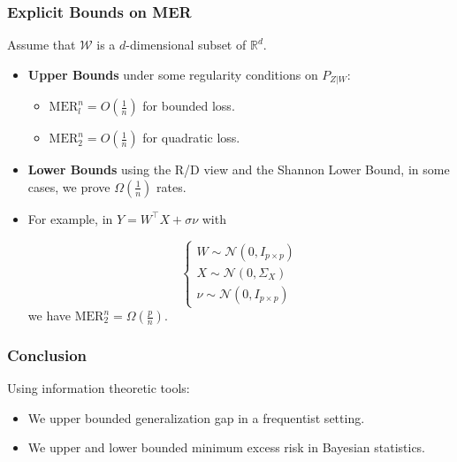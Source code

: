 \documentclass[usenames,dvipsnames, 10pt]{beamer}
\newcommand{\R}{\mathbb{R}}
\begin{document}
\begin{frame}
	\frametitle{Explicit Bounds on MER}
	Assume that $\mathcal{W}$ is a $d$-dimensional subset of $\R^d$.
	
	\vspace{0.5cm}
	
	\begin{itemize}
		\item \textbf{Upper Bounds} under some regularity conditions on $P_{Z|W}$:
		\begin{itemize}
			\item $\mathrm{MER}_l^n = O(\frac{1}{n})$ for bounded loss.			
			\vspace{0.2cm}
			
			\item $\mathrm{MER}_2^n = O(\frac{1}{n})$ for quadratic loss.
			
		\end{itemize}		 
		 \pause
		 \item  \textbf{Lower Bounds} using the R/D view and the Shannon Lower Bound, in some cases, we prove $\Omega(\frac{1}{n})$ rates.
		 \pause
		 \item For example, in $Y = W^\top X  + \sigma \nu$ with 
		 
		 \begin{equation*}
		 	\begin{cases}
			 	W \sim \mathcal{N}(0, I_{p\times p})\\
			 	X \sim \mathcal{N}(0, \Sigma_X)\\
			 	\nu \sim \mathcal{N}(0, I_{p\times p})
		 	\end{cases}
		 \end{equation*}		 		 
		  we have $\mathrm{MER}_2^n = \Omega(\frac{p}{n})$.
	\end{itemize}
	
	
\end{frame}


\begin{frame}
	\frametitle{Conclusion}
	Using information theoretic tools:
	
	\vspace{0.5cm}
	\begin{itemize}
		\item We upper bounded generalization gap in a frequentist setting.
		\item We upper and lower bounded minimum excess risk in Bayesian statistics.
	\end{itemize}
\end{frame}
\end{document}
